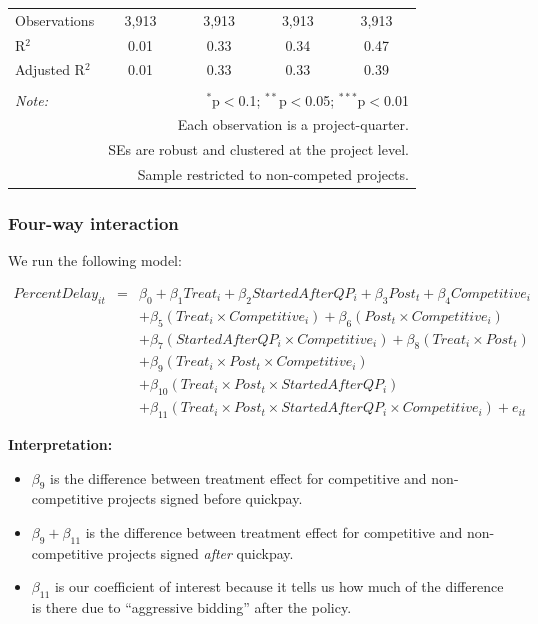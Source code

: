 \documentclass[
]{article}
\providecommand{\tightlist}{%
  \setlength{\itemsep}{0pt}\setlength{\parskip}{0pt}}
\begin{document}
\begin{table}[H]
\begin{tabular}{@{\extracolsep{-2pt}}lcccc}
Observations & 3,913 & 3,913 & 3,913 & 3,913 \\ 
R$^{2}$ & 0.01 & 0.33 & 0.34 & 0.47 \\ 
Adjusted R$^{2}$ & 0.01 & 0.33 & 0.33 & 0.39 \\ 
\hline 
\hline \\[-1.8ex] 
\textit{Note:}  & \multicolumn{4}{r}{$^{*}$p$<$0.1; $^{**}$p$<$0.05; $^{***}$p$<$0.01} \\ 
 & \multicolumn{4}{r}{Each observation is a project-quarter.} \\ 
 & \multicolumn{4}{r}{SEs are robust and clustered at the project level.} \\ 
 & \multicolumn{4}{r}{Sample restricted to non-competed projects.} \\ 
\end{tabular} 
\end{table}

\hypertarget{four-way-interaction}{%
\subsubsection{Four-way interaction}\label{four-way-interaction}}

We run the following model:

\[\begin{aligned} PercentDelay_{it} &=& \beta_0 +\beta_1 Treat_i+ \beta_2 StartedAfterQP_i+ \beta_3 Post_t+ \beta_4 Competitive_i\\ && +  \beta_5 (Treat_i \times Competitive_i) + \beta_6 (Post_t \times Competitive_i)\\ && +  \beta_7 (StartedAfterQP_i \times Competitive_i) +\beta_8 (Treat_i \times Post_t)\\ && + \beta_9 (Treat_i \times Post_t \times Competitive_i) \\ && + \beta_{10} (Treat_i \times Post_t \times StartedAfterQP_i )\\ && + \beta_{11} (Treat_i \times Post_t \times StartedAfterQP_i \times Competitive_i) + e_{it} \end{aligned}\]

\textbf{Interpretation:}

\begin{itemize}
\tightlist
\item
  \(\beta_9\) is the difference between treatment effect for competitive
  and non-competitive projects signed before quickpay.
\item
  \(\beta_9 + \beta_{11}\) is the difference between treatment effect
  for competitive and non-competitive projects signed \emph{after}
  quickpay.
\item
  \(\beta_{11}\) is our coefficient of interest because it tells us how
  much of the difference is there due to ``aggressive bidding'' after
  the policy.
\end{itemize}
\end{document}
